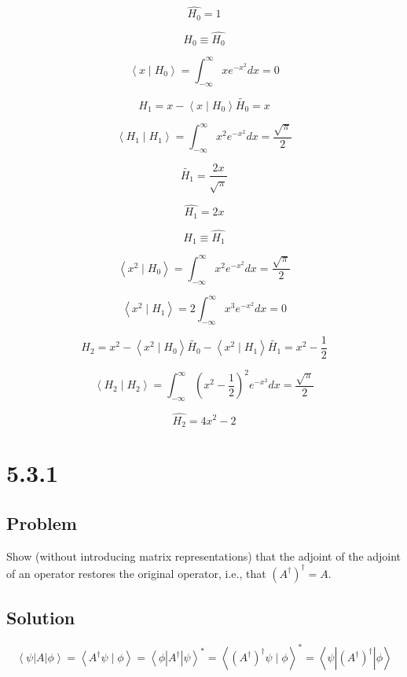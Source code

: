 \documentclass[12pt]{article}
\begin{document}
\[
    \hat{H_0} = 1
\]

\[
    H_0 \equiv \hat{H_0}
\]

\[
    \left\langle x \mid H_0\right\rangle = \int_{-\infty}^{\infty} x e^{-x^2} d x = 0
\]

\[
    H_1 = x - \left\langle x \mid H_0\right\rangle \tilde{H_0} = x
\]

\[
    \left\langle H_1 \mid H_1\right\rangle = \int_{-\infty}^{\infty} x^2 e^{-x^2} d x = \frac{\sqrt{\pi}}{2}
\]

\[
    \tilde{H_1} = \frac{2 x}{\sqrt{\pi}}
\]

\[
    \hat{H_1} = 2 x
\]

\[
    H_1 \equiv \hat{H_1}
\]

\[
    \left\langle x^2 \mid H_0\right\rangle = \int_{-\infty}^{\infty} x^2 e^{-x^2} d x = \frac{\sqrt{\pi}}{2}
\]

\[
    \left\langle x^2 \mid H_1\right\rangle = 2 \int_{-\infty}^{\infty} x^3 e^{-x^2} d x = 0
\]

\[
    H_2 = x^2 - \left\langle x^2 \mid H_0\right\rangle \tilde{H_0} - \left\langle x^2 \mid H_1\right\rangle \tilde{H_1} = x^2 - \frac{1}{2}
\]

\[
    \left\langle H_2 \mid H_2\right\rangle = \int_{-\infty}^{\infty} {(x^2 - \frac{1}{2})}^2 e^{-x^2} d x = \frac{\sqrt{\pi}}{2}
\]

\[
    \hat{H_2} = 4 x^2 - 2
\]

\newpage
\section{5.3.1}

\subsection{Problem}

Show (without introducing matrix representations) that the adjoint of the adjoint of an operator restores the original operator, i.e., that \({\left(A^{\dagger}\right)}^{\dagger}=A\).

\subsection{Solution}

\[
    \left\langle\psi\left|A\right| \phi\right\rangle
    = \left\langle A^{\dagger} \psi \mid \phi\right\rangle
    = \left\langle\phi\left|A^{\dagger}\right| \psi\right\rangle^{*}
    = \left\langle {\left(A^{\dagger}\right) }^{\dagger} \psi \mid \phi\right\rangle^{*}
    = \left\langle\psi\left|{\left(A^{\dagger}\right) }^{\dagger}\right| \phi\right\rangle
\]
\end{document}
